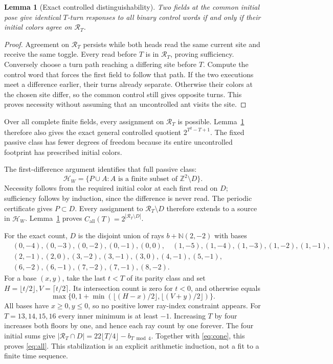 \documentclass[11pt]{article}
\newtheorem{lemma}[theorem]{Lemma}
\theoremstyle{definition}\newtheorem{definition}[theorem]{Definition}
\newcommand{\HH}{\mathcal H_W}
\newcommand{\RR}{\mathcal R_T}
\newcommand{\N}{\mathbb N}
\newcommand{\Z}{\mathbb Z}
\begin{document}
\begin{lemma}[Exact controlled distinguishability]\label{lem:cone}
Two fields at the common initial pose give identical $T$-turn responses to all
binary control words if and only if their initial colors agree on $\RR$.
\end{lemma}
\begin{proof}
Agreement on $\RR$ persists while both heads read the same current site and
receive the same toggle. Every read before $T$ is in $\RR$, proving sufficiency.
Conversely choose a turn path reaching a differing site before $T$. Compute the
control word that forces the first field to follow that path. If the two executions
meet a difference earlier, their turns already separate. Otherwise their colors
at the chosen site differ, so the common control still gives opposite turns.
This proves necessity without assuming that an uncontrolled ant visits the site.
\end{proof}

Over all complete finite fields, every assignment on $\RR$ is possible.
Lemma~\ref{lem:cone} therefore also gives the exact general controlled quotient
$2^{T^2-T+1}$. The fixed passive class has fewer degrees of freedom because its
entire uncontrolled footprint has prescribed initial colors.

The first-difference argument identifies that full passive class:
\begin{equation}\label{eq:class}
\HH=\{P\cup A:A\text{ is a finite subset of }\Z^2\setminus D\}.
\end{equation}
Necessity follows from the required initial color at each first read on $D$;
sufficiency follows by induction, since the difference is never read. The
periodic certificate gives $P\subset D$. Every assignment to $\RR\setminus D$
therefore extends to a source in $\HH$. Lemma~\ref{lem:cone} proves
$C_{\mathrm{all}}(T)=2^{|\RR\setminus D|}$.

For the exact count, $D$ is the disjoint union of rays $b+\N(2,-2)$ with bases
\begin{align*}
&(0,-4),(0,-3),(0,-2),(0,-1),(0,0),\quad
(1,-5),(1,-4),(1,-3),(1,-2),(1,-1),\\
&(2,-1),(2,0),(3,-2),(3,-1),(3,0),(4,-1),(5,-1),\\
&(6,-2),(6,-1),(7,-2),(7,-1),(8,-2).
\end{align*}
For a base $(x,y)$, take the last $t<T$ of its parity class and set
$H=\lfloor t/2\rfloor,V=\lceil t/2\rceil$. Its intersection count is zero for
$t<0$, and otherwise equals
\begin{equation}\label{eq:ray}
\max\{0,1+\min(\lfloor(H-x)/2\rfloor,\lfloor(V+y)/2\rfloor)\}.
\end{equation}
All bases have $x\ge0,y\le0$, so no positive lower ray-index constraint appears.
For $T=13,14,15,16$ every inner minimum is at least $-1$. Increasing $T$ by four
increases both floors by one, and hence each ray count by one forever. The four
initial sums give $|\RR\cap D|=22\lfloor T/4\rfloor-b_{T\bmod4}$.
Together with \eqref{eq:cone}, this proves \eqref{eq:all}. This stabilization is
an explicit arithmetic induction, not a fit to a finite time sequence.
\end{document}
